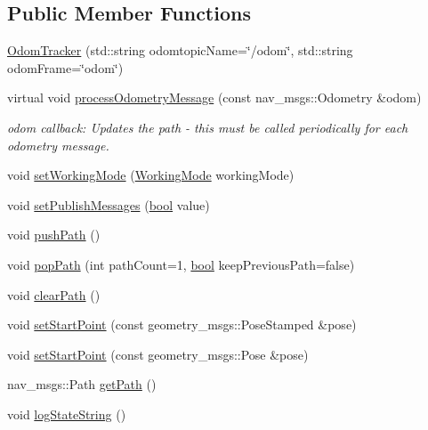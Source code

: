 \subsection*{Public Member Functions}
\begin{DoxyCompactItemize}
\item 
\hyperlink{classcl__move__base__z_1_1odom__tracker_1_1OdomTracker_a99e1f405d0b3ec3e9fc73e666793c409}{Odom\+Tracker} (std\+::string odomtopic\+Name=\char`\"{}/odom\char`\"{}, std\+::string odom\+Frame=\char`\"{}odom\char`\"{})
\item 
virtual void \hyperlink{classcl__move__base__z_1_1odom__tracker_1_1OdomTracker_a12c5a839cfde2e8f2f55a5e0c9647b18}{process\+Odometry\+Message} (const nav\+\_\+msgs\+::\+Odometry \&odom)
\begin{DoxyCompactList}\small\item\em odom callback\+: Updates the path -\/ this must be called periodically for each odometry message. \end{DoxyCompactList}\item 
void \hyperlink{classcl__move__base__z_1_1odom__tracker_1_1OdomTracker_aeed01bdefd9a1cc709b0b3e4eed285ed}{set\+Working\+Mode} (\hyperlink{namespacecl__move__base__z_1_1odom__tracker_ac46b05813b2791604f6cd0a39ace3ef8}{Working\+Mode} working\+Mode)
\item 
void \hyperlink{classcl__move__base__z_1_1odom__tracker_1_1OdomTracker_a3b3cf9010e4e4fe4f96cfafd5a529517}{set\+Publish\+Messages} (\hyperlink{classbool}{bool} value)
\item 
void \hyperlink{classcl__move__base__z_1_1odom__tracker_1_1OdomTracker_a205ee48ec8b4599658e7408fc4755239}{push\+Path} ()
\item 
void \hyperlink{classcl__move__base__z_1_1odom__tracker_1_1OdomTracker_a2749e5cd0443423d50864a0166b078b9}{pop\+Path} (int path\+Count=1, \hyperlink{classbool}{bool} keep\+Previous\+Path=false)
\item 
void \hyperlink{classcl__move__base__z_1_1odom__tracker_1_1OdomTracker_a93a14e15e3e623f530e056f403bf7644}{clear\+Path} ()
\item 
void \hyperlink{classcl__move__base__z_1_1odom__tracker_1_1OdomTracker_a9f4989c6353022c2ec3b0546c09bf3bc}{set\+Start\+Point} (const geometry\+\_\+msgs\+::\+Pose\+Stamped \&pose)
\item 
void \hyperlink{classcl__move__base__z_1_1odom__tracker_1_1OdomTracker_a4aefe72c155bd0d57c9f42b77a8928a6}{set\+Start\+Point} (const geometry\+\_\+msgs\+::\+Pose \&pose)
\item 
nav\+\_\+msgs\+::\+Path \hyperlink{classcl__move__base__z_1_1odom__tracker_1_1OdomTracker_a762bc88653ebb7d78e693ba465fb160f}{get\+Path} ()
\item 
void \hyperlink{classcl__move__base__z_1_1odom__tracker_1_1OdomTracker_a6d0b450474d9d555205ff4281965164e}{log\+State\+String} ()
\end{DoxyCompactItemize}
